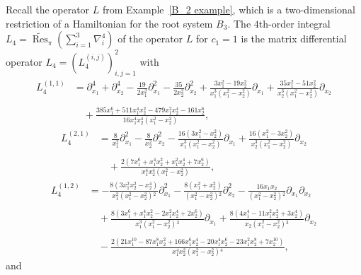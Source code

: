 \documentclass[12pt]{amsart}
\DeclareMathOperator{\Res}{Res}
\numberwithin{equation}{section}
\theoremstyle{definition}
\begin{document}
Recall the operator $L$ from Example~\ref{B_2 example}, which is a two-dimensional restriction of a Hamiltonian for the root system $B_3$.
The $4$th-order integral $L_4 = \widetilde{\Res}_{\pi}( \sum_{i = 1}^3 \nabla_i^4)$ of the operator $L$ %
for $c_1 = 1$ is the matrix differential operator $L_4 = (L_4^{(i,j)})_{i,j=1}^2$ with 
\begin{align*}
    L_4^{(1,1)} &= 
    \partial_{x_1}^4 + \partial_{x_2}^4
    -\frac{19}{2 x_1^2} \partial_{x_1}^2
    -\frac{35}{2x_2^2} \partial_{x_2}^2
    +\frac{3 x_1^2-19 x_2^2}{x_1^3 \left(x_1^2-x_2^2\right)}\partial_{x_1}
    +\frac{35 x_1^2-51 x_2^2}{x_2^3\left(x_1^2-x_2^2\right)}\partial_{x_2} \\ \ \\
    &\quad +\frac{385 x_1^6+511 x_1^4 x_2^2 -479 x_1^2 x_2^4 -161 x_2^6}{16 x_1^4 x_2^4\left(x_1^2-x_2^2\right)},
\end{align*}
\begin{align*}
    L_4^{(2,1)} &= 
    \frac{8}{x_1^2}\partial_{x_1}^2-\frac{8}{x_2^2} \partial_{x_2}^2
    -\frac{16 \left(3x_1^2-x_2^2\right)}{x_1^3 \left(x_1^2-x_2^2\right)}\partial_{x_1} +\frac{16 \left(x_1^2-3 x_2^2\right)}{x_2^3\left(x_1^2-x_2^2\right)}\partial_{x_2} \\ \ \\
    &\quad 
   +\frac{2 \left(7 x_1^6+ x_1^4x_2^2+x_1^2x_2^4+7 x_2^6\right)}{x_1^4x_2^4 \left(x_1^2-x_2^2\right)},
\end{align*}
\begin{align*}
    L_4^{(1,2)} &=
    -\frac{8 \left(3 x_1^2 x_2^2-x_2^4\right)}{x_1^2 \left(x_1^2-x_2^2\right){}^2}\partial_{x_1}^2
    -\frac{8 \left(x_1^2+x_2^2\right)}{\left(x_1^2-x_2^2\right){}^2}\partial_{x_2}^2
    -\frac{16 x_1 x_2}{\left(x_1^2-x_2^2\right){}^2}\partial_{x_1}\partial_{x_2} \\ \ \\
    &\quad +\frac{8 \left(3 x_1^6+ x_1^4 x_2^2 -2 x_1^2 x_2^4 +2 x_2^6\right)}{x_1^3\left(x_1^2-x_2^2\right){}^3}\partial_{x_1}
    +\frac{8 \left(4 x_1^4-11 x_1^2 x_2^2 +3 x_2^4\right)}{x_2\left(x_1^2-x_2^2\right){}^3}\partial_{x_2} \\ \ \\
    &\quad -\frac{2 \left(21 x_1^{10}-87 x_1^8 x_2^2 +166 x_1^6 x_2^4 -20 x_1^4 x_2^6 -23 x_1^2 x_2^8 +7 x_2^{10}\right)}{x_1^4 x_2^2 \left(x_1^2-x_2^2\right){}^4},
\end{align*}
and
\end{document}
